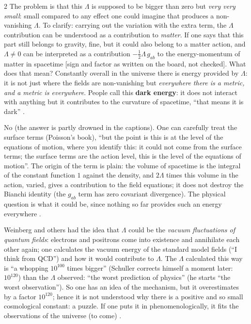 \begin{paracol}{2}
The problem is that this $\Lambda$ is supposed to be bigger than zero but \emph{very very small}: small compared to any effect one could imagine that produces a non-vanishing $\Lambda$. To clarify: carrying out the variation with the extra term, the $\Lambda$ contribution can be understood as a contribution to \emph{matter}. If one says that this part still belongs to gravity, fine, but it could also belong to a matter action, and $\Lambda\neq0$ can be interpreted as a contribution $-\tfrac12\Lambda\,g_{ab}$ to the energy-momentum of matter in spacetime [sign and factor as written on the board, not checked]. What does that mean? Constantly overall in the universe there is energy provided by $\Lambda$: it is not just where the fields are non-vanishing but \emph{everywhere there is a metric, and a metric is everywhere}. People call this \textbf{dark energy}: it does not interact with anything but it contributes to the curvature of spacetime, ``that means it is dark'' .
\begin{coursenote}
No (the answer is partly drowned in the captions). One can carefully treat the surface terms (Poisson's book), ``but the point is this is at the level of the equations of motion, where you identify this: it could not come from the surface terms; the surface terms are the action level, this is the level of the equations of motion''. The origin of the term is plain: the volume of spacetime is the integral of the constant function $1$ against the density, and $2\Lambda$ times this volume in the action, varied, gives a contribution to the field equations; it does not destroy the Bianchi identity (the $g_{ab}$ term has zero covariant divergence). The physical question is what it could be, since nothing so far provides such an energy everywhere .
\end{coursenote}
\begin{aside}
Weinberg and others had the idea that $\Lambda$ could be the \emph{vacuum fluctuations of quantum fields}: electrons and positrons come into existence and annihilate each other again; one calculates the vacuum energy of the standard model fields (``I think from QCD'') and how it would contribute to $\Lambda$. The $\Lambda$ calculated this way is ``a whopping $10^{100}$ times bigger'' (Schuller corrects himself a moment later: $10^{120}$) than the $\Lambda$ observed: ``the worst prediction of physics'' (he starts ``the worst observation''). So one has an idea of the mechanism, but it overestimates by a factor $10^{120}$; hence it is not understood why there is a positive and so small cosmological constant: a puzzle. If one puts it in phenomenologically, it fits the observations of the universe (to come) .
\end{aside}


\end{paracol}
